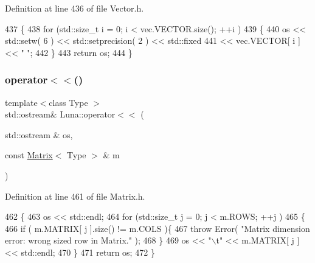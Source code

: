 Definition at line 436 of file Vector.\+h.


\begin{DoxyCode}
437   \{
438     \textcolor{keywordflow}{for} (std::size\_t i = 0; i < vec.VECTOR.size(); ++i )
439     \{
440       os << std::setw( 6 ) << std::setprecision( 2 ) << std::fixed
441          << vec.VECTOR[ i ] << \textcolor{stringliteral}{" "};
442     \}
443     \textcolor{keywordflow}{return} os;
444   \}
\end{DoxyCode}
\mbox{\label{namespaceLuna_af2f7e56c33c9d269a0120294c4c37d24}} 
\subsubsection{\texorpdfstring{operator$<$$<$()}{operator<<()}\hspace{0.1cm}{\footnotesize\ttfamily [5/5]}}
{\footnotesize\ttfamily template$<$class Type $>$ \\
std\+::ostream\& Luna\+::operator$<$$<$ (\begin{DoxyParamCaption}\item[{std\+::ostream \&}]{os,  }\item[{const \hyperlink{classLuna_1_1Matrix}{Matrix}$<$ Type $>$ \&}]{m }\end{DoxyParamCaption})\hspace{0.3cm}{\ttfamily [inline]}}



Definition at line 461 of file Matrix.\+h.


\begin{DoxyCode}
462   \{
463     os << std::endl;
464     \textcolor{keywordflow}{for} (std::size\_t j = 0; j < m.ROWS; ++j )
465     \{
466       \textcolor{keywordflow}{if} ( m.MATRIX[ j ].size() != m.COLS )\{
467         \textcolor{keywordflow}{throw} Error( \textcolor{stringliteral}{"Matrix dimension error: wrong sized row in Matrix."} );
468       \}
469       os << \textcolor{stringliteral}{"\(\backslash\)t"} << m.MATRIX[ j ] << std::endl;
470     \}
471     \textcolor{keywordflow}{return} os;
472   \}
\end{DoxyCode}
